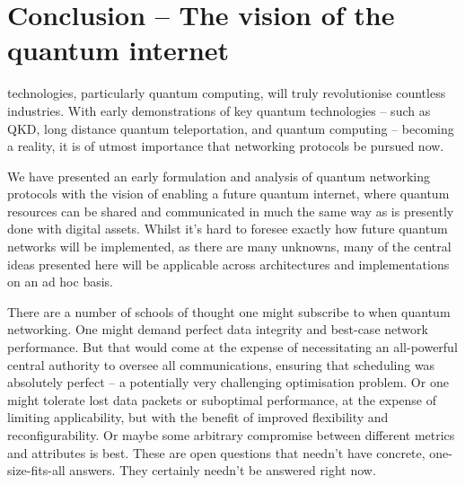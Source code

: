 %
%

\newline

\newline

\newline

\section{Conclusion -- The vision of the quantum internet} \label{sec:vision_quant} 

\newline


 technologies, particularly quantum computing, will truly revolutionise countless industries. With early demonstrations of key quantum technologies -- such as QKD, long distance quantum teleportation, and quantum computing -- becoming a reality, it is of utmost importance that networking protocols be pursued now.

We have presented an early formulation and analysis of quantum networking protocols with the vision of enabling a future quantum internet, where quantum resources can be shared and communicated in much the same way as is presently done with digital assets. Whilst it's hard to foresee exactly how future quantum networks will be implemented, as there are many unknowns, many of the central ideas presented here will be applicable across architectures and implementations on an ad hoc basis.

There are a number of schools of thought one might subscribe to when quantum networking. One might demand perfect data integrity and best-case network performance. But that would come at the expense of necessitating an all-powerful central authority to oversee all communications, ensuring that scheduling was absolutely perfect -- a potentially very challenging optimisation problem. Or one might tolerate lost data packets or suboptimal performance, at the expense of limiting applicability, but with the benefit of improved flexibility and reconfigurability. Or maybe some arbitrary compromise between different metrics and attributes is best. These are open questions that needn't have concrete, one-size-fits-all answers. They certainly needn't be answered right now.

